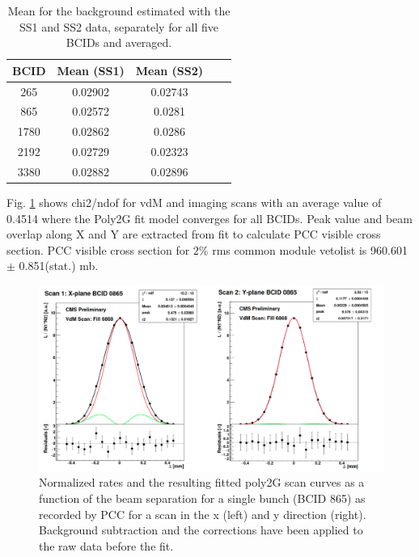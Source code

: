 \begin{table}
  \begin{center}
    \begin{tabular}{ccccc}
    \textbf{BCID}   & \textbf{Mean (SS1)} & \textbf{Mean (SS2)} \\ \hline
      265     &  0.02902    &  0.02743    \\
        865  &    0.02572  &     0.0281  \\
       1780    &  0.02862   &     0.0286  \\
       2192   &  0.02729  &     0.02323  \\
        3380  &  0.02882  &    0.02896   \\
      \end{tabular}
    \caption[Background in PCC rate]{Mean for the background estimated with the SS1 and SS2 data, separately for all five BCIDs and averaged.}
    \label{tab:vdm:SS1_SS2}
  \end{center}
\end{table}

Fig. \ref{fig:fitquality} shows chi2/ndof for vdM and imaging scans with an average value of 0.4514 where the Poly2G fit model converges for all BCIDs. Peak value and beam overlap along X and Y are extracted from fit to calculate PCC visible cross section. PCC visible cross section for $2\%$ rms common module vetolist is 960.601 $\pm$ 0.851(stat.) mb.

\begin{figure}[h]
    \centering
    \includegraphics[width=1\textwidth]{ashish_thesis/vdM_fit_cveto.png}
    \caption[PCC rate fit]{Normalized rates and the resulting fitted poly2G scan curves as a function of the beam separation for a single bunch (BCID 865) as recorded by PCC for a scan in the x (left) and y direction (right). Background subtraction and the corrections  have been applied to the raw data before the fit.}
    \label{fig:fitquality}
\end{figure}


